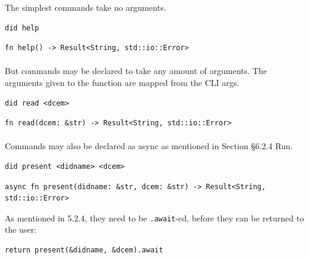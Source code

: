 The simplest commands take no arguments.

\begin{lstlisting}
did help
\end{lstlisting}

\begin{lstlisting}
fn help() -> Result<String, std::io::Error>
\end{lstlisting}


\paragraph{}

But commands may be declared to take any amount of arguments. The
arguments given to the function are mapped from the CLI args.

\begin{lstlisting}
did read <dcem>
\end{lstlisting}

\begin{lstlisting}
fn read(dcem: &str) -> Result<String, std::io::Error>
\end{lstlisting}



\paragraph{}

Commands may also be declared as async as mentioned in Section §6.2.4 Run.

\begin{lstlisting}
did present <didname> <dcem>
\end{lstlisting}

\begin{lstlisting}
async fn present(didname: &str, dcem: &str) -> Result<String, std::io::Error>
\end{lstlisting}

As mentioned in 5.2.4, they need to be
\lstinline!.await!-ed, before they can be returned to the
user:

\begin{lstlisting}
return present(&didname, &dcem).await
\end{lstlisting}



\pagebreak



